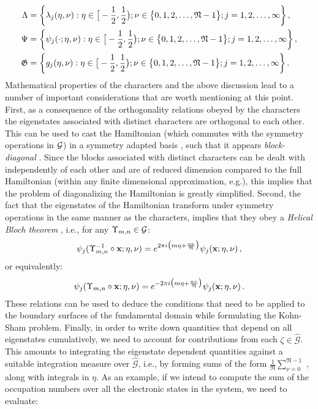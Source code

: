 \documentclass[preprint,12pt, 3p, sort&compress]{elsarticle}
\begin{document}
\begin{align}
\nonumber
\Lambda &=\bigg\{\lambda_j(\eta,\nu): \eta \in \big[-\frac{1}{2},\frac{1}{2} \big); \nu \in   \big\{0,1,2,\ldots,\mathfrak{N} - 1 \big\}; j=1,2,\ldots,\infty \bigg\}\,,\\\nonumber
\Psi &=\bigg\{\psi_j(\cdot;\eta,\nu): \eta \in \big[-\frac{1}{2},\frac{1}{2} \big); \nu \in   \big\{0,1,2,\ldots,\mathfrak{N} - 1 \big\}; j=1,2,\ldots,\infty \bigg\}\,,\\
\mathfrak{G} &=\bigg\{g_j(\eta,\nu): \eta \in \big[-\frac{1}{2},\frac{1}{2} \big); \nu \in   \big\{0,1,2,\ldots,\mathfrak{N} - 1 \big\}; j=1,2,\ldots,\infty \bigg\}\,.
\end{align}
Mathematical properties of the characters and the above discussion lead to a number of important  considerations that are worth mentioning at this point. First, as a consequence of the orthogonality relations obeyed by the characters \citep{Folland_Harmonic, Barut_Reps} the eigenstates associated with distinct characters are orthogonal to each other. This can be used to cast the Hamiltonian (which commutes with the symmetry operations in ${\cal G}$)  in a symmetry adapted basis \citep{McWeeny}, such that it appears \textit{block-diagonal} \citep{My_PhD_Thesis, banerjee2021ab}. Since the blocks associated with distinct characters can be dealt with   independently of each other and are of reduced dimension compared to the full Hamiltonian (within any finite dimensional approximation, e.g.), this implies that the  problem of diagonalizing the Hamiltonian is greatly simplified. Second, the fact that the eigenstates of the Hamiltonian transform under symmetry operations in the same manner as the characters, implies that they obey a \textit{Helical Bloch theorem} \citep{My_PhD_Thesis, banerjee2021ab, koskinen2016quantum, Dumitrica_Tight_Binding1}, i.e., for any $\Upsilon_{m,n} \in {\cal G}$:
\begin{align}
\psi_j(\Upsilon_{m,n}^{-1}\circ {\bf x};\eta,\nu) = e^{2\pi i \big({m \eta + \frac{n\nu}{ \mathfrak{N}} }\big)} \psi_j({\bf x};\eta,\nu)\,,
\label{eq:Bloch_theorem_1}
\end{align}
or equivalently:
\begin{align}
\label{eq:Bloch_theorem_2}
\psi_j(\Upsilon_{m,n} \circ {\bf x};\eta,\nu) = e^{-2\pi i \big({m \eta + \frac{n\nu}{ \mathfrak{N}} }\big)} \psi_j({\bf x};\eta,\nu)\,.
\end{align}
These relations can be used to deduce the conditions that need to be applied to the boundary surfaces of the fundamental domain while formulating the Kohn-Sham problem.  Finally, in order to write down quantities that depend on all eigenstates cumulatively, we need to account for contributions from each $\zeta \in \widehat{\mathcal{G}}$. This amounts to integrating the eigenstate dependent quantities against a suitable integration measure over $\widehat{\mathcal{G}}$, i.e., by forming sums of the form $\displaystyle \frac{1}{\mathfrak{N}} \sum_{\nu=0}^{\mathfrak{N}-1}$ , along with integrals in $\eta$. As an example, if we intend to compute the sum of the occupation numbers over all the electronic states in the system, we need to evaluate:
\end{document}
